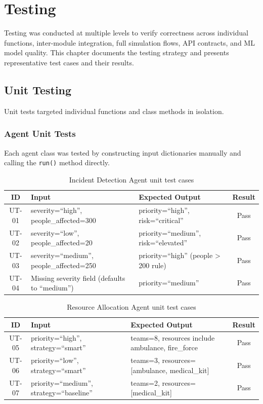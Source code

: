 \chapter{Testing}
\label{ch:testing}

Testing was conducted at multiple levels to verify correctness across individual functions, inter-module integration, full simulation flows, API contracts, and ML model quality. This chapter documents the testing strategy and presents representative test cases and their results.

\section{Unit Testing}
\label{sec:unit_testing}

Unit tests targeted individual functions and class methods in isolation.

\subsection{Agent Unit Tests}

Each agent class was tested by constructing input dictionaries manually and calling the \texttt{run()} method directly.

\begin{table}[H]
\centering
\caption{Incident Detection Agent unit test cases}
\label{tab:unit_incident}
\begin{tabularx}{\textwidth}{|c|X|X|c|}
\hline
\textbf{ID} & \textbf{Input} & \textbf{Expected Output} & \textbf{Result} \\
\hline
UT-01 & severity=``high'', people\_affected=300 & priority=``high'', risk=``critical'' & Pass \\
\hline
UT-02 & severity=``low'', people\_affected=20 & priority=``medium'', risk=``elevated'' & Pass \\
\hline
UT-03 & severity=``medium'', people\_affected=250 & priority=``high'' (people > 200 rule) & Pass \\
\hline
UT-04 & Missing severity field (defaults to ``medium'') & priority=``medium'' & Pass \\
\hline
\end{tabularx}
\end{table}

\begin{table}[H]
\centering
\caption{Resource Allocation Agent unit test cases}
\label{tab:unit_resource}
\begin{tabularx}{\textwidth}{|c|X|X|c|}
\hline
\textbf{ID} & \textbf{Input} & \textbf{Expected Output} & \textbf{Result} \\
\hline
UT-05 & priority=``high'', strategy=``smart'' & teams=8, resources include ambulance, fire\_force & Pass \\
\hline
UT-06 & priority=``low'', strategy=``smart'' & teams=3, resources=[ambulance, medical\_kit] & Pass \\
\hline
UT-07 & priority=``medium'', strategy=``baseline'' & teams=2, resources=[medical\_kit] & Pass \\
\hline
\end{tabularx}
\end{table}

